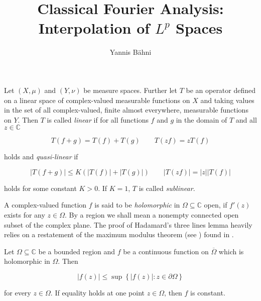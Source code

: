 


\title{Classical Fourier Analysis: Interpolation of $L^p$ Spaces}
\author{Yannis B\"{a}hni}
\address[Yannis B\"{a}hni]{University of Zurich, R\"{a}mistrasse 71, 8006 Zurich}

\maketitle

\addtocounter{section}{1}

\begin{mdframed}
	\begin{definition}
		Let $(X,\mu)$ and $(Y,\nu)$ be measure spaces. Further let $T$ be an operator defined on a linear space of complex-valued measurable functions on $X$ and taking values in the set of all complex-valued, finite almost everywhere, measurable functions on $Y$. Then $T$ is called \emph{linear} if for all functions $f$ and $g$ in the domain of $T$ and all $z \in \mathbb{C}$ 

		\begin{equation*}
			T\left( f + g \right) = T(f) + T(g) \qquad T\left( zf \right) = zT(f)
		\end{equation*}

		holds and \emph{quasi-linear} if

		\begin{equation*}
			\left| T\left( f + g \right) \right| \leqslant K \left( \left| T(f)\right| + \left| T(g)\right| \right) \qquad \left| T(zf) \right| = \left| z\right| \left| T(f)\right|
		\end{equation*}

		holds for some constant $K > 0$. If $K = 1$, $T$ is called \emph{sublinear}.
	\end{definition}
\end{mdframed}

\vspace{2mm}

A complex-valued function $f$ is said to be \emph{holomorphic} in $\Omega \subseteq \mathbb{C}$ open, if $f'(z)$ exists for any $z \in \Omega$. By a region we shall mean a nonempty connected open subset of the complex plane. The proof of Hadamard's three lines lemma heavily relies on a restatement of the maximum modulus theorem (see \cite[212]{rudin:rc_analysis:1987}) found in \cite[253]{rudin:rc_analysis:1987}.

\begin{theorem*}
	Let $\Omega \subseteq \mathbb{C}$ be a bounded region and $f$ be a continuous function on $\overline{\Omega}$ which is holomorphic in $\Omega$. Then 

	\begin{equation*}
		\left| f(z)\right| \leqslant \sup\left\{ \left|f(z) \right| : z \in \partial\Omega\right\}
	\end{equation*}

	for every $z \in \Omega$. If equality holds at one point $z \in \Omega$, then $f$ is constant.
\end{theorem*}

